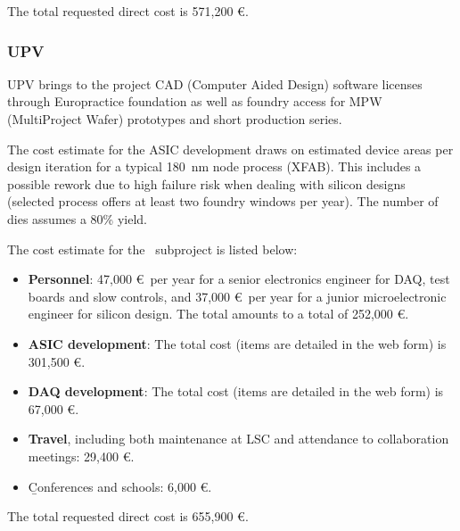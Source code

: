 The total requested direct cost is 571,200 \euro.

\subsubsection{UPV}
UPV brings to the project CAD (Computer Aided Design) software licenses through Europractice foundation as well as foundry access for MPW (MultiProject Wafer) prototypes and short production series. 

The cost estimate for the ASIC development draws on estimated device areas per design iteration for a typical 180~nm node process (XFAB). This includes a possible rework due to high failure risk when dealing with silicon designs (selected process offers at least two foundry windows per year). The number of dies assumes a 80\% yield. 

The cost estimate for the \sUPV\ subproject is listed below:
\begin{itemize}[noitemsep,topsep=0pt,parsep=0pt,partopsep=0pt]
    \item {\bf Personnel}: 47,000 \euro\ per year for a senior electronics engineer for DAQ, test boards and slow controls, and 37,000 \euro\ per year for a 
junior microelectronic engineer for silicon design. The total amounts to a total of 252,000 \euro.
\item {\bf ASIC development}: The total cost (items are detailed in the web form) is 301,500 \euro.
\item {\bf DAQ development}: The total cost (items are detailed in the web form) is 67,000 \euro. 
\item {\bf Travel}, including both maintenance at LSC and attendance to collaboration meetings: 29,400 \euro. 
\item {\b Conferences and schools}: 6,000 \euro.
\end{itemize}

The total requested direct cost is 655,900 \euro.


